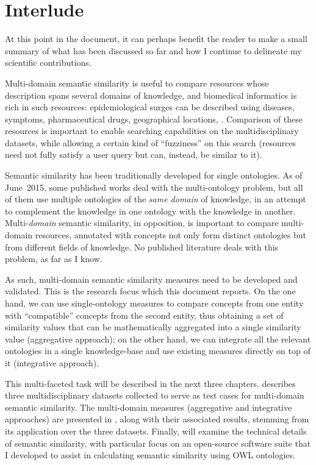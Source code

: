 \chapter*[Interlude]{Interlude}

At this point in the document, it can perhaps benefit the reader to make a small summary of what has been discussed so far and how I continue to delineate my scientific contributions.

Multi-domain semantic similarity is useful to compare resources whose description spans several domains of knowledge, and biomedical informatics is rich in such resources: \eg epidemiological surges can be described using diseases, symptoms, pharmaceutical drugs, geographical locations, \etc. Comparison of these resources is important to enable searching capabilities on the multidisciplinary datasets, while allowing a certain kind of ``fuzziness'' on this search (resources need not fully satisfy a user query but can, instead, be similar to it).

Semantic similarity has been traditionally developed for single ontologies. As of June~2015, some published works deal with the multi-ontology problem, but all of them use multiple ontologies of the \emph{same domain} of knowledge, in an attempt to complement the knowledge in one ontology with the knowledge in another. Multi-\emph{domain} semantic similarity, in opposition, is important to compare multi-domain resources, annotated with concepts not only form distinct ontologies but from different fields of knowledge. No published literature deals with this problem, as far as I know.

As such, multi-domain semantic similarity measures need to be developed and validated. This is the research focus which this document reports. On the one hand, we can use single-ontology measures to compare concepts from one entity with ``compatible'' concepts from the second entity, thus obtaining a set of similarity values that can be mathematically aggregated into a single similarity value (aggregative approach); on the other hand, we can integrate all the relevant ontologies in a single knowledge-base and use existing measures directly on top of it (integrative approach).

This multi-faceted task will be described in the next three chapters.  describes three multidisciplinary datasets collected to serve as test cases for multi-domain semantic similarity. The multi-domain measures (aggregative and integrative approaches) are presented in , along with their associated results, stemming from its application over the three datasets. Finally,  will examine the technical details of semantic similarity, with particular focus on an open-source software suite that I developed to assist in calculating semantic similarity using OWL ontologies.

